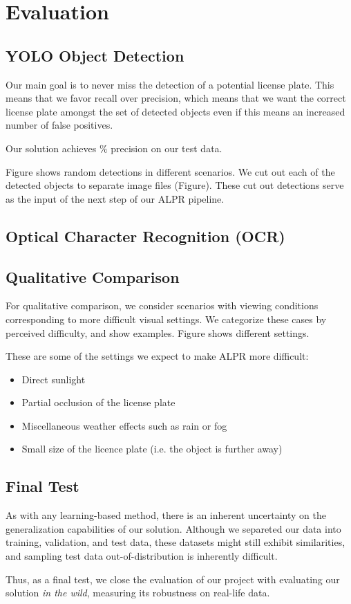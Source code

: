 \section{Evaluation}
\subsection{YOLO Object Detection}
Our main goal is to never miss the detection of a potential license plate. This
means that we favor recall over precision, which means that we want the correct
license plate amongst the set of detected objects even if this means an
increased number of false positives.

Our solution achieves \todo{}$\%$ precision on our test data. 

Figure \todo{} shows random detections in different scenarios. We cut out each
of the detected objects to separate image files (Figure\todo{}). These cut out
detections serve as the input of the next step of our \ac{ALPR} pipeline.
\subsection{Optical Character Recognition (OCR)}


\subsection{Qualitative Comparison}
For qualitative comparison, we consider scenarios with viewing conditions
corresponding to more difficult visual settings. We categorize these cases by
perceived difficulty, and show examples. Figure  shows
different settings. 

These are some of the settings we expect to make \ac{ALPR} more
difficult:
\begin{itemize}
    \item Direct sunlight 
    \item Partial occlusion of the license plate 
    \item Miscellaneous weather effects such as rain or fog
    \item Small size of the licence plate (i.e. the object is further away)
\end{itemize}

\subsection{Final Test}
As with any learning-based method, there is an inherent uncertainty on the
generalization capabilities of our solution. Although we separeted our data into
training, validation, and test data, these datasets might still exhibit
similarities, and sampling test data out-of-distribution is inherently
difficult.

Thus, as a final test, we close the evaluation of our project with evaluating
our solution \textit{in the wild}, measuring its robustness on real-life data.


